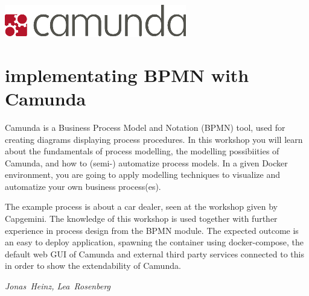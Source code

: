 \hfill\includegraphics[width=.5\linewidth]{images/camunda_logo.png}
\section*{implementating BPMN with Camunda}

Camunda is a Business Process Model and Notation (BPMN) tool, used for creating diagrams displaying process procedures. In this workshop you will learn about the fundamentals of process modelling, the modelling possibiities of Camunda, and how to (semi-) automatize process models. In a given Docker environment, you are going to apply modelling techniques to visualize and automatize your own business process(es).

The example process is about a car dealer, seen at the workshop given by Capgemini. The knowledge of this workshop is used together with further experience in process design from the BPMN module.  The expected outcome is an easy to deploy application, spawning the container using docker-compose, the default web GUI of Camunda and external third party services connected to this in order to show the extendability of Camunda.

\hfill\textit{Jonas~Heinz, Lea~Rosenberg}
